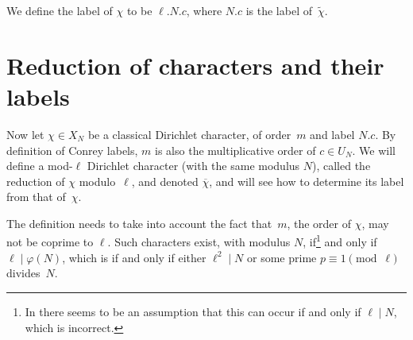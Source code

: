 \documentclass[a4paper, 10pt]{amsart}
\newcommand{\CLab}[2]{$#1.#2$}
\newcommand{\DLab}[3]{$#1.#2.#3$}   %
\begin{document}
We define the label of $\chi$ to be \DLab{\ell}{N}{c}, where
\CLab{N}{c} is the label of~$\tilde{\chi}$.

\section{Reduction of characters and their labels}

Now let $\chi\in X_N$ be a classical Dirichlet character, of
order~$m$ and label \CLab{N}{c}.  By definition of Conrey labels, $m$
is also the multiplicative order of $c\in U_N$.  We will define a
mod-$\ell$ Dirichlet character (with the same modulus $N$), called the
reduction of $\chi$ modulo~$\ell$, and denoted $\overline{\chi}$, and
will see how to determine its label from that of~$\chi$.

The definition needs to take into account the fact that~$m$, the order
of $\chi$, may not be coprime to $\ell$.  Such characters exist, with
modulus $N$, if\footnote{In \cite{OldDef} there seems to be an
  assumption that this can occur if and only if $\ell\mid N$, which is
  incorrect.} and only if $\ell\mid\varphi(N)$, which is if and only
if either $\ell^2\mid N$ or some prime $p\equiv1\pmod{\ell}$
divides~$N$.
\end{document}
